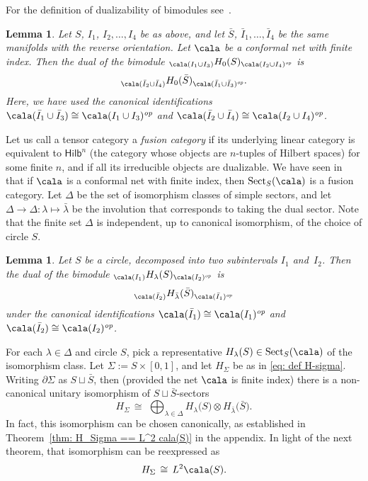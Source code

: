 \documentclass[a4paper,10pt,leqno]{amsart}
\newcommand{\secDualizability}{Sec.~4}
\newcommand{\lemHS}{Lem.~3.5}
\newcommand{\thmKLallirreduciblesectorsarefinite}{Thm.~3.14}
\newcommand{\lemdualofHlambda}{Lem.~3.17}
\newcommand{\thmKLM}{Thm.~3.24}
\theoremstyle{plain}
\newtheorem{lemma}[theorem]{Lemma}
\theoremstyle{definition}
\theoremstyle{remark}
\DeclareMathOperator{\Rep}{Sect}
\newcommand{\op}{{\mathit{op}}}
\begin{document}
\noindent For the definition of dualizability of bimodules 
see~\cite[\secDualizability]{BDH(Dualizability+Index-of-subfactors)}.

\begin{lemma}\cite[\lemHS]{BDH(nets)} \label{lem: H_0(-S)}
Let $S$, $I_1$, $I_2,\ldots,I_4$ be as above, and
let $\bar S$, $\bar I_1,\ldots,\bar I_4$ be the same manifolds with the reverse orientation.
Let $\cala$ be a conformal net with finite index.
Then the dual of the bimodule ${}_{\cala(I_1\cup I_3)}H_0(S)_{\cala(I_2\cup I_4)^\op}$
is
\[
{}_{\cala(\bar I_2\cup \bar I_4)}H_0(\bar S)_{\cala(\bar I_1\cup \bar I_3)^\op}.
\]
Here, we have used the canonical identifications
$\cala(\bar I_1\cup \bar I_3)\cong \cala(I_1\cup I_3)^\op$ and
$\cala(\bar I_2\cup \bar I_4)\cong \cala(I_2\cup I_4)^\op$.
\end{lemma}


Let us call a tensor category a \emph{fusion category} if its underlying linear category is equivalent to $\mathsf{Hilb}^n$
(the category whose objects are $n$-tuples of Hilbert spaces) for some finite $n$, and if all its irreducible objects are dualizable.
We have seen in~\cite[\thmKLallirreduciblesectorsarefinite]{BDH(nets)} that if $\cala$ is a conformal net with finite index, then $\Rep_S(\cala)$ is a fusion category.
Let $\Delta$ be the set of isomorphism classes of simple sectors,
and let $\Delta\to \Delta:\lambda\mapsto \bar \lambda$ be the involution that corresponds to taking the dual sector.
Note that the finite set $\Delta$ is independent, up to canonical isomorphism, of the choice of circle $S$.

\begin{lemma}\cite[\lemdualofHlambda]{BDH(nets)}\label{lem: dual of H_lambda}
Let $S$ be a circle, decomposed into two subintervals $I_1$ and~$I_2$.
Then the dual of the bimodule ${}_{\cala(I_1)}H_\lambda(S)_{\cala(I_2)^\op}$ is
\[
{}_{\cala(\bar I_2)}H_{\bar \lambda}(\bar S)_{\cala(\bar I_1)^\op}
\]
under the canonical identifications 
$\cala(\bar I_1)\cong \cala(I_1)^\op$ and $\cala(\bar I_2)\cong \cala(I_2)^\op$.
\end{lemma}

For each $\lambda\in\Delta$ and circle $S$, pick a representative $H_\lambda(S)\in \Rep_S(\cala)$ of the isomorphism class.
Let $\Sigma:=S\times[0,1]$, and let $H_\Sigma$ be as in \eqref{eq: def H-sigma}.
Writing $\partial\Sigma$ as $S\sqcup \bar S$, then (provided the net $\cala$ is finite index) there is a 
non-canonical unitary isomorphism of 
$S\sqcup \bar S$-sectors~\cite[\thmKLM]{BDH(nets)}
\begin{equation} \label{eq:   KLM  }
H_\Sigma \,\cong\,\, \bigoplus_{\lambda\in\Delta} H_\lambda\big(S\big) \otimes H_{\bar \lambda}\big(\bar S\big).
\end{equation}
In fact, this isomorphism can be chosen canonically, as established in Theorem~\ref{thm: H_Sigma == L^2 cala(S)} in the appendix.  In light of the next theorem, that isomorphism can be reexpressed as
\begin{equation} \label{eq:HSigmaL^2}
H_\Sigma \,\cong\, L^2 \cala(S).
\end{equation}
\end{document}
